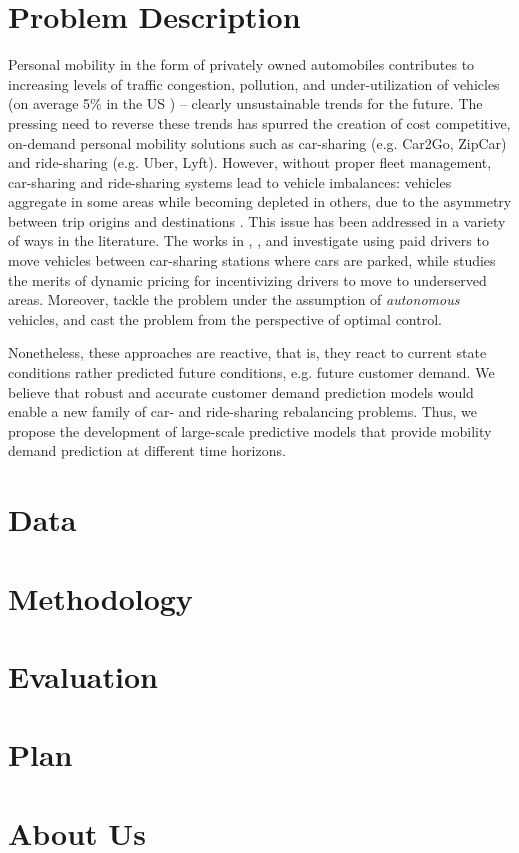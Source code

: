 \documentclass[12pt]{article}
\begin{document}
\maketitle

\section{Problem Description}

Personal mobility in the form of privately owned automobiles contributes to increasing levels of traffic congestion, pollution, and under-utilization of vehicles (on average 5\% in the US \cite{DN:15}) -- clearly unsustainable trends for the future. The pressing need to reverse these trends has spurred the creation of cost competitive, on-demand personal mobility solutions such as car-sharing (e.g. Car2Go, ZipCar) and ride-sharing (e.g. Uber, Lyft).
However, without proper fleet management, car-sharing and ride-sharing systems lead to vehicle imbalances: vehicles aggregate in some areas while becoming depleted in others, due to the asymmetry between trip origins and destinations \cite{RZ-MP:15_MODa}. This issue has been addressed in a variety of ways in the literature. The works in \cite{MN-SZ-SB-MJR:15}, \cite{BB-KGZ-NG:15}, and \cite{FA-DDP-AR:14} investigate using paid drivers to move vehicles between car-sharing stations where cars are parked, while \cite{SB-RJ-CR:15} studies the merits of dynamic pricing for incentivizing drivers to move to underserved areas. Moreover, \cite{RZ-MP:15_MODa,RI-FR-RZ-MP:16,RZ-FR-MP:16,RZ-FR-MP:16a} tackle the problem under the assumption of \emph{autonomous} vehicles, and cast the problem from the perspective of optimal control.

Nonetheless, these approaches are reactive, that is, they react to current state conditions rather predicted future conditions, e.g. future customer demand. We believe that robust and accurate customer demand prediction models would enable a new family of car- and ride-sharing rebalancing problems. Thus, we propose the development of large-scale predictive models that provide mobility demand prediction at different time horizons.

\section{Data}


\section{Methodology}\label{methods}


\section{Evaluation}\label{evaluation}


\section{Plan}\label{plan}


\section{About Us}\label{about}



\end{document}
